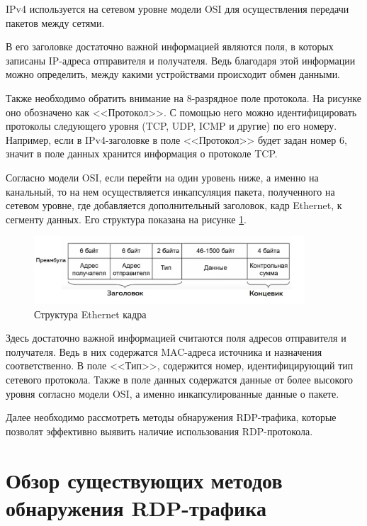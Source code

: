\documentclass[bachelor, och, coursework]{SCWorks}
\begin{document}
    IPv4 используется на сетевом уровне модели OSI для осуществления передачи пакетов между сетями.

    В его заголовке достаточно важной информацией являются поля, в которых записаны IP-адреса отправителя и получателя. Ведь благодаря этой информации можно
    определить, между какими устройствами происходит обмен данными.

    Также необходимо обратить внимание на 8-разрядное поле протокола. На рисунке оно обозначено как <<Протокол>>. С помощью него можно 
    идентифицировать протоколы следующего уровня (TCP, UDP, ICMP и другие) по его номеру. Например, если в IPv4-заголовке в поле <<Протокол>> 
    будет задан номер 6, значит в поле данных хранится информация о протоколе TCP.
    
    Согласно модели OSI, если перейти на один уровень ниже, а именно на канальный, то на нем осуществляется инкапсуляция пакета, полученного на сетевом уровне, где
    добавляется дополнительный заголовок, кадр Ethernet, к сегменту данных. Его структура показана на рисунке \ref{eth-frame}.

    \begin{figure}[H]
      \centering
      \includegraphics[width=0.9\textwidth]{photo/eth-frame.jpg}
      \caption{Структура Ethernet кадра}
      \label{eth-frame}
    \end{figure}

    Здесь достаточно важной информацией считаются поля адресов отправителя и получателя.
    Ведь в них содержатся MAC-адреса источника и назначения соответственно.
    В поле <<Тип>>, содержится номер, идентифицирующий тип сетевого протокола. 
    Также в поле данных содержатся данные от более высокого уровня согласно модели OSI, а именно инкапсулированные данные о пакете.

    Далее необходимо рассмотреть методы обнаружения RDP-трафика, которые позволят эффективно выявить наличие использования RDP-протокола.


\section{Обзор существующих методов обнаружения RDP-трафика}
\end{document}
